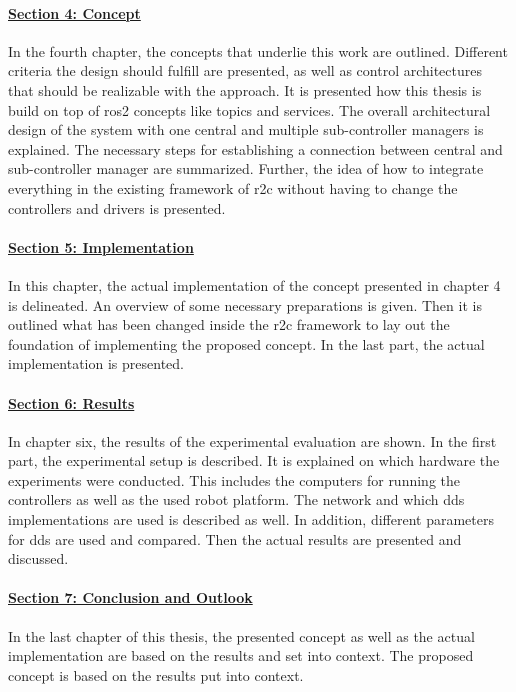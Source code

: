 \paragraph{\hyperref[sec:concept]{Section 4: Concept}}
In the fourth chapter, the concepts that underlie this work are outlined. Different criteria the design should fulfill are presented, as well as control architectures that should be realizable with the approach. It is presented how this thesis is build on top of \gls{ros2} concepts like \glspl{topic} and \glspl{service}. The overall architectural design of the system with one central and multiple sub-controller managers is explained. The necessary steps for establishing a connection between central and sub-controller manager are summarized. Further, the idea of how to integrate everything in the existing framework of \gls{r2c} without having to change the controllers and drivers is presented.

\paragraph{\hyperref[sec:implementation]{Section 5: Implementation}}
In this chapter, the actual implementation of the concept presented in chapter 4 is delineated. An overview of some necessary preparations is given. Then it is outlined what has been changed inside the \gls{r2c} framework to lay out the foundation of implementing the proposed concept. In the last part, the actual implementation is presented.

\paragraph{\hyperref[sec:results]{Section 6: Results}}
In chapter six, the results of the experimental evaluation are shown. In the first part, the experimental setup is described. It is explained on which hardware the experiments were conducted. This includes the computers for running the controllers as well as the used robot platform. The network and which \gls{dds} implementations are used is described as well. In addition, different parameters for \gls{dds} are used and compared. Then the actual results are presented and discussed.

\paragraph{\hyperref[sec:conclusion_and_outlook]{Section 7: Conclusion and Outlook}}
In the last chapter of this thesis, the presented concept as well as the actual implementation are  based on the results and set into context. The proposed concept is based on the results put into context.

